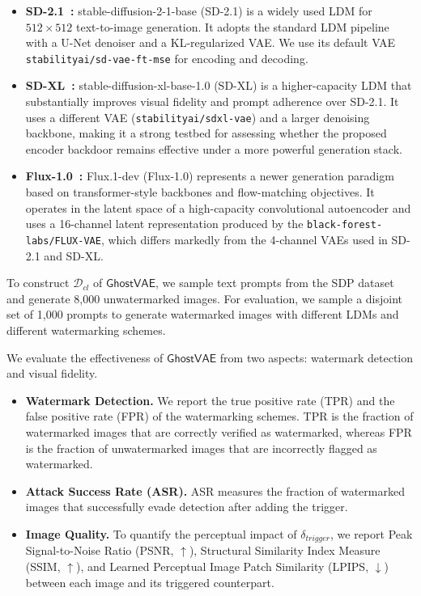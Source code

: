 \documentclass[letterpaper,twocolumn,10pt]{article}
\newcommand{\mg}{$\mathsf{GhostVAE}$\xspace}
\newcommand{\mypara}[1]{\smallskip\noindent{\bf {#1}.} \xspace}
\begin{document}
\begin{itemize}

\item \textbf{SD-2.1~\cite{Rombach2021HighResolutionIS}:} 
stable-diffusion-2-1-base (SD-2.1) is a widely used LDM for $512\times512$ text-to-image generation.
It adopts the standard LDM pipeline with a U-Net denoiser and a KL-regularized VAE.
We use its default VAE \texttt{stabilityai/sd-vae-ft-mse} for encoding and decoding.

\item \textbf{SD-XL~\cite{podell2024sdxl}:} 
stable-diffusion-xl-base-1.0 (SD-XL) is a higher-capacity LDM that substantially improves visual fidelity and prompt adherence over SD-2.1.
It uses a different VAE (\texttt{stabilityai/sdxl-vae}) and a larger denoising backbone, making it a strong testbed for assessing whether the proposed encoder backdoor remains effective under a more powerful generation stack.

\item \textbf{Flux-1.0~\cite{labs2025flux1kontextflowmatching}:} 
Flux.1-dev (Flux-1.0) represents a newer generation paradigm based on transformer-style backbones and flow-matching objectives.
It operates in the latent space of a high-capacity convolutional autoencoder and uses a 16-channel latent representation produced by the \texttt{black-forest-labs/FLUX-VAE}, which differs markedly from the 4-channel VAEs used in SD-2.1 and SD-XL.
\end{itemize}

\mypara{Datasets}
To construct $\mathcal{D}_{cl}$ of \mg, we sample text prompts from the SDP dataset~\cite{gustavosta_sd_prompts} and generate 8,000 unwatermarked images.
For evaluation, we sample a disjoint set of 1,000 prompts to generate watermarked images with different LDMs and different watermarking schemes.

\mypara{Metrics}
We evaluate the effectiveness of \mg from two aspects: watermark detection and visual fidelity.
\begin{itemize}
\item \textbf{Watermark Detection.}
We report the true positive rate (TPR) and the false positive rate (FPR) of the watermarking schemes.
TPR is the fraction of watermarked images that are correctly verified as watermarked,
whereas FPR is the fraction of unwatermarked images that are incorrectly flagged as watermarked.
\item \textbf{Attack Success Rate (ASR).}
ASR measures the fraction of watermarked images that successfully evade detection after adding the trigger.
\item \textbf{Image Quality.}
To quantify the perceptual impact of $\delta_{trigger}$, we report Peak Signal-to-Noise Ratio (PSNR, $\uparrow$), Structural Similarity Index Measure (SSIM, $\uparrow$), and Learned Perceptual Image Patch Similarity (LPIPS, $\downarrow$) between each image and its triggered counterpart.
\end{itemize}
\end{document}

